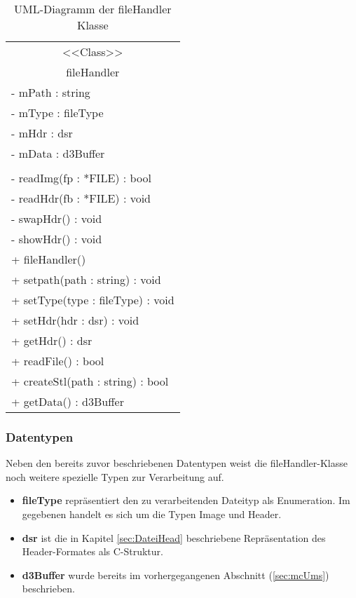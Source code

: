 \begin{table}[H]
	\centering
	\caption{UML-Diagramm der fileHandler Klasse}
	\label{fig:fileHandler}
	\begin{tabular}{|l|}
		\hline
		\multicolumn{1}{|c|}{<<Class>>} \\
		\multicolumn{1}{|c|}{fileHandler} \\
		\hline
		- mPath : string\\
		- mType : fileType\\
		- mHdr  : dsr\\
		- mData : d3Buffer\\
		\\
		- readImg(fp : *FILE) : bool\\
		- readHdr(fb : *FILE) : void\\
		- swapHdr() : void\\
		- showHdr() : void\\
		\hline
		+ fileHandler()\\
		+ setpath(path : string) : void\\
		+ setType(type : fileType) : void\\
		+ setHdr(hdr : dsr) : void\\
		+ getHdr() : dsr\\
		+ readFile() : bool\\
		+ createStl(path : string) : bool\\
		+ getData() : d3Buffer\\
		\hline
	\end{tabular}
\end{table}

\subsubsection{Datentypen}
Neben den bereits zuvor beschriebenen Datentypen weist die fileHandler-Klasse noch weitere spezielle Typen zur Verarbeitung auf.\\
\begin{itemize}
	\item \textbf{fileType} repräsentiert den zu verarbeitenden Dateityp als Enumeration. Im gegebenen handelt es sich um die Typen Image und Header.
	\item \textbf{dsr} ist die in Kapitel \ref{sec:DateiHead} beschriebene Repräsentation des Header-Formates als C-Struktur.
	\item \textbf{d3Buffer} wurde bereits im vorhergegangenen Abschnitt (\ref{sec:mcUms}) beschrieben.
\end{itemize}
